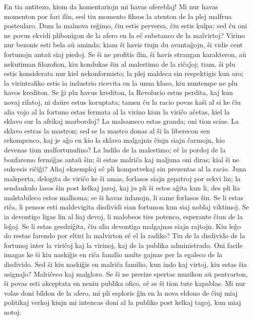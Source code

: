 \documentclass{book}
\begin{document}
En tia antitezo, kiom da komentariojn mi havas ofereblaj! Mi nur
havas momenton por fari ilin, sed tiu momento fiksos la atenton
de la plej malfrua posteularo. Dum la malnova reĝimo, ĉiu estis
perversa, ĉiu estis kulpa; sed ĉu oni ne povus ekvidi plibonigon
de la afero en la eĉ substanco de la malvirtoj? Virino nur
bezonis esti bela aŭ aminda; kiam ŝi havis tiujn du avantaĝojn,
ŝi vidis cent fortunojn antaŭ siaj piedoj. Se ŝi ne profitis
ilin, ŝi havis strangan karakteron, aŭ nekutiman filozofion, kiu
kondukas ŝin al malestimo de la riĉaĵoj; tiam, ŝi plu estis
konsiderata nur kiel nekonformisto; la plej maldeca sin
respektigis kun oro; la virintrafiko estis ia industrio ricevita
en la unua klaso, kiu nuntempe ne plu havos krediton. Se ĝi plu
havus krediton, la Revolucio estus perdita, kaj kun novaj
rilatoj, ni daŭre estus koruptata; tamen ĉu la racio povas kaŝi
al si ke ĉiu alia vojo al la fortuno estas fermata al la virino
kiun la viriĉo aĉetas, kiel la sklavo sur la afrikaj marbordoj?
La malsameco estas granda; oni tion scias. La sklavo estras la
mastron; sed se la mastro donas al ŝi la liberecon sen
rekompenco, kaj je aĝo en kio la sklavo malgajnis ĉiujn siajn
ĉarmojn, kio devenas tiun malfortunulino? La ludilo de la
malestimo; eĉ la pordoj de la bonfaremo fermiĝas antaŭ ŝin; ŝi
estas malriĉa kaj maljuna oni diras; kial ŝi ne sukcesis riĉiĝi?
Aliaj ekzemploj eĉ pli kompatvekaj sin prezentas al la racio.
Juna malsperta, delogita de viriĉo ke ŝi amas, forlasos siajn
gepatroj por sekvi lin; la sendankulo lasos ŝin post kelkaj
jaroj, kaj ju pli ŝi estos aĝita kun li, des pli lia malstabileco
estos malhoma; se ŝi havas infanojn, li same forlasos ŝin. Se li
estas riĉa, li pensos esti maldevigita disdividi sian fortunon
kun siaj noblaj viktimoj. Se ia devontigo ligas lin al liaj
devoj, li malobeos ties potenco, esperante ĉiun de la leĝoj.
Se li estas geedziĝita, ĉiu alia devontigo malgajnas siajn
rajtojn. Kiu leĝo do restas farendo por eltiri la malvirton eĉ el
la radiko? Tiu de la disdivido de la fortunoj inter la viriĉoj
kaj la virinoj, kaj de la publika administrado. Oni facile imagas
ke ŝi kiu naskiĝis en riĉa familio multe gajnas per la egaleco de
la disdivido. Sed ŝi kiu naskiĝis en malriĉa familio, kun indo
kaj virtoj, kiu estas ŝia asignaĵo? Malriĉeco kaj malgloro. Se ŝi
ne precize spertas muzikon aŭ pentrarton, ŝi povas esti
akceptata en neniu publika ofico, eĉ se ŝi tion tute kapablas. Mi
nur volas doni bildon de la afero, mi pli esploris ĝin en la nova
eldono de ĉiuj miaj politikaj verkoj kiujn mi intencas doni al la
publiko post kelkaj tagoj, kun miaj notoj.
\end{document}
